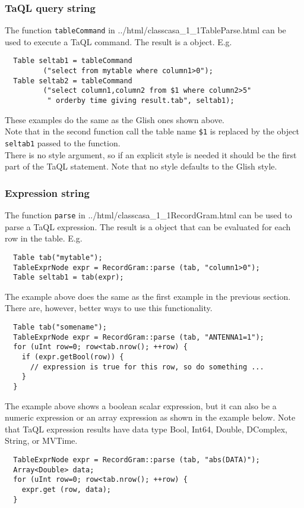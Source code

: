 \subsubsection{TaQL query string}
    The function \texttt{tableCommand} in
    {../html/classcasa_1_1TableParse.html}
    can be used to execute a TaQL command. The result is a
    object. E.g.
\begin{verbatim}
  Table seltab1 = tableCommand
         ("select from mytable where column1>0");
  Table seltab2 = tableCommand
         ("select column1,column2 from $1 where column2>5"
          " orderby time giving result.tab", seltab1);
\end{verbatim}
    These examples do the same as the Glish ones shown above.
    \\Note that in the second function call the table name
    \texttt{\$1} is replaced by the object \texttt{seltab1}
    passed to the function.
    \\There is no style argument, so if an explicit style is needed it
    should be the first part of the TaQL statement. Note that no style
    defaults to the Glish style.

\subsubsection{Expression string}
    The function \texttt{parse} in
    {../html/classcasa_1_1RecordGram.html}
    can be used to parse a TaQL expression. The result is a
    object that can be evaluated for each row in the table. E.g.
\begin{verbatim}
  Table tab("mytable");
  TableExprNode expr = RecordGram::parse (tab, "column1>0");
  Table seltab1 = tab(expr);
\end{verbatim}
    The example above does the same as the first example in the previous
    section. There are, however, better ways to use this functionality.
\begin{verbatim}
  Table tab("somename");
  TableExprNode expr = RecordGram::parse (tab, "ANTENNA1=1");
  for (uInt row=0; row<tab.nrow(); ++row) {
    if (expr.getBool(row)) {
      // expression is true for this row, so do something ...
    }
  }
\end{verbatim}
    The example above shows a boolean scalar expression, but it can also be
    a numeric expression or an array expression as shown in the example
    below.
    Note that TaQL expression results have data type Bool, Int64, Double,
    DComplex, String, or MVTime.
\begin{verbatim}
  TableExprNode expr = RecordGram::parse (tab, "abs(DATA)");
  Array<Double> data;
  for (uInt row=0; row<tab.nrow(); ++row) {
    expr.get (row, data);
  }
\end{verbatim}

